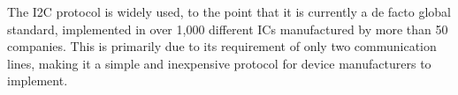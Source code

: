 The I2C protocol is widely used, to the point that it is currently a de facto global 
standard, implemented in over 1,000 different ICs manufactured by more than 50 
companies. This is primarily due to its requirement of only two communication lines, 
making it a simple and inexpensive protocol for device manufacturers to implement.





